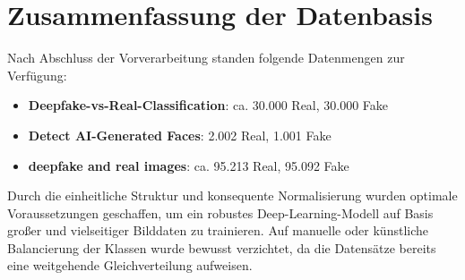 \section{Zusammenfassung der Datenbasis}

Nach Abschluss der Vorverarbeitung standen folgende Datenmengen zur Verfügung:

\begin{itemize}
    \item \textbf{Deepfake-vs-Real-Classification}: ca. 30.000 Real, 30.000 Fake
    \item \textbf{Detect AI-Generated Faces}: 2.002 Real, 1.001 Fake
    \item \textbf{deepfake and real images}: ca. 95.213 Real, 95.092 Fake
\end{itemize}

Durch die einheitliche Struktur und konsequente Normalisierung wurden optimale Voraussetzungen geschaffen, um ein robustes Deep-Learning-Modell auf Basis großer und vielseitiger Bilddaten zu trainieren. Auf manuelle oder künstliche Balancierung der Klassen wurde bewusst verzichtet, da die Datensätze bereits eine weitgehende Gleichverteilung aufweisen.
